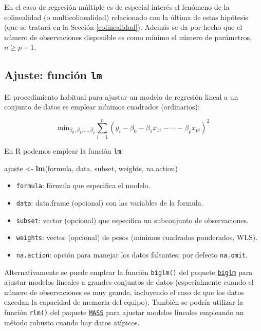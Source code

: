 \documentclass[
  spanish,
]{book}
\newenvironment{Shaded}{\begin{snugshade}}{\end{snugshade}}
\newcommand{\KeywordTok}[1]{\textcolor[rgb]{0.13,0.29,0.53}{\textbf{#1}}}
\newcommand{\NormalTok}[1]{#1}
\newcommand{\StringTok}[1]{\textcolor[rgb]{0.31,0.60,0.02}{#1}}
\theoremstyle{break}
\theoremstyle{definition}
\theoremstyle{definition}
\theoremstyle{definition}
\theoremstyle{remark}
\begin{document}
En el caso de regresión múltiple es de especial interés el fenómeno de la colinealidad (o multicolinealidad) relacionado con la última de estas hipótesis (que se tratará en la Sección \ref{colinealidad}).
Además se da por hecho que el número de observaciones disponible es como mínimo el número de parámetros, \(n \geq p + 1\).

\hypertarget{ajuste-funciuxf3n-lm}{%
\subsection{\texorpdfstring{Ajuste: función \texttt{lm}}{Ajuste: función lm}}\label{ajuste-funciuxf3n-lm}}

El procedimiento habitual para ajustar un modelo de regresión lineal a un conjunto de datos es emplear mínimos cuadrados (ordinarios):

\[\mbox{min}_{\beta_{0},\beta_{1},\ldots,\beta_{p}}  \sum\limits_{i=1}^{n}\left(  y_{i} - \beta_0 - \beta_1 x_{1i} - \cdots - \beta_p x_{pi} \right)^{2}\]

En R podemos emplear la función \texttt{lm}:

\begin{Shaded}
\begin{Highlighting}[]
\NormalTok{ajuste <-}\StringTok{ }\KeywordTok{lm}\NormalTok{(formula, data, subset, weights, na.action)}
\end{Highlighting}
\end{Shaded}

\begin{itemize}
\item
  \texttt{formula}: fórmula que especifica el modelo.
\item
  \texttt{data}: data.frame (opcional) con las variables de la formula.
\item
  \texttt{subset}: vector (opcional) que especifica un subconjunto de observaciones.
\item
  \texttt{weights}: vector (opcional) de pesos (mínimos cuadrados ponderados, WLS).
\item
  \texttt{na.action}: opción para manejar los datos faltantes; por defecto \texttt{na.omit}.
\end{itemize}

Alternativamente se puede emplear la función \texttt{biglm()} del paquete \href{https://CRAN.R-project.org/package=biglm}{\texttt{biglm}} para ajustar modelos lineales a grandes conjuntos de datos (especialmente cuando el número de observaciones es muy grande, incluyendo el caso de que los datos excedan la capacidad de memoria del equipo).
También se podría utilizar la función \texttt{rlm()} del paquete \href{https://CRAN.R-project.org/package=MASS}{\texttt{MASS}} para ajustar modelos lineales empleando un método robusto cuando hay datos atípicos.
\end{document}
